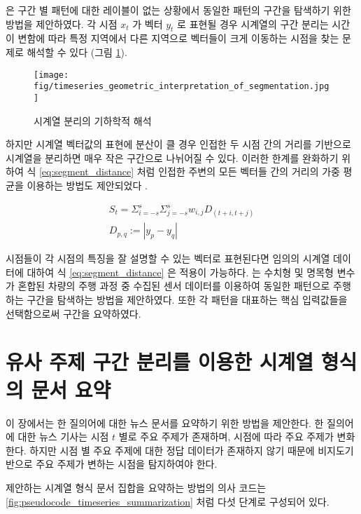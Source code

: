 \documentclass[oneside, ko,phd]{snuthesis_utf8_kor}
\begin{document}
\cite{kim2019representation} 은 구간 별 패턴에 대한 레이블이 없는 상황에서 동일한 패턴의 구간을 탐색하기 위한 방법을 제안하였다.
각 시점 $x_t$ 가 벡터 $y_t$ 로 표현될 경우 시계열의 구간 분리는 시간이 변함에 따라 특정 지역에서 다른 지역으로 벡터들이 크게 이동하는 시점을 찾는 문제로 해석할 수 있다 (그림 \ref{fig:timeseries_geometric_interpretation_of_segmentation}).

\begin{figure}[H]
\centering
\texttt{[image: fig/timeseries\_geometric\_interpretation\_of\_segmentation.jpg]}
\caption{시계열 분리의 기하학적 해석}
\label{fig:timeseries_geometric_interpretation_of_segmentation}
\end{figure}

하지만 시계열 벡터값의 표현에 분산이 클 경우 인접한 두 시점 간의 거리를 기반으로 시계열을 분리하면 매우 작은 구간으로 나뉘어질 수 있다.
이러한 한계를 완화하기 위하여 식 \ref{eq:segment_distance} 처럼 인접한 주변의 모든 벡터들 간의 거리의 가중 평균을 이용하는 방법도 제안되었다 \cite{foote2000automatic}.

\begin{equation}
\begin{split}
S_t = \Sigma_{i=-s}^{s} \Sigma_{j=-s}^{s} w_{i,j} D_{(t+i,t+j)} \\
D_{p,q} := |y_p - y_q|
\end{split}
\label{eq:segment_distance}
\end{equation}

시점들이 각 시점의 특징을 잘 설명할 수 있는 벡터로 표현된다면 임의의 시계열 데이터에 대하여 식 \ref{eq:segment_distance} 은 적용이 가능하다.
\cite{kim2019representation} 는 수치형 및 명목형 변수가 혼합된 차량의 주행 과정 중 수집된 센서 데이터를 이용하여 동일한 패턴으로 주행하는 구간을 탐색하는 방법을 제안하였다.
또한 각 패턴을 대표하는 핵심 입력값들을 선택함으로써 구간을 요약하였다.

\section{유사 주제 구간 분리를 이용한 시계열 형식의 문서 요약}

이 장에서는 한 질의어에 대한 뉴스 문서를 요약하기 위한 방법을 제안한다.
한 질의어에 대한 뉴스 기사는 시점 $t$ 별로 주요 주제가 존재하며, 시점에 따라 주요 주제가 변화한다.
하지만 시점 별 주요 주제에 대한 정답 데이터가 존재하지 않기 때문에 비지도기반으로 주요 주제가 변하는 시점을 탐지하여야 한다.

제안하는 시계열 형식 문서 집합을 요약하는 방법의 의사 코드는 \ref{fig:pseudocode_timeseries_summarization} 처럼 다섯 단계로 구성되어 있다.
\end{document}
